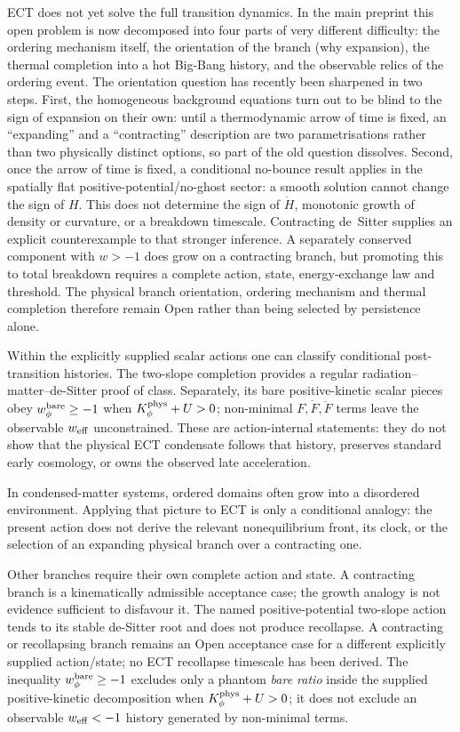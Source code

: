 \documentclass[11pt,a4paper]{article}
\begin{document}
ECT does not yet solve the full transition dynamics.
In the main preprint this open problem is now decomposed into four
parts of very different difficulty: the ordering mechanism itself,
the orientation of the branch (why expansion), the thermal completion
into a hot Big-Bang history, and the observable relics of the
ordering event.
The orientation question has recently been sharpened in two steps.
First, the homogeneous background equations turn out to be blind to
the sign of expansion on their own: until a thermodynamic arrow of
time is fixed, an ``expanding'' and a ``contracting'' description are
two parametrisations rather than two physically distinct options, so
part of the old question dissolves.
Second, once the arrow of time is fixed, a conditional no-bounce
result applies in the spatially flat positive-potential/no-ghost sector: a
smooth solution cannot change the sign of $H$.  This does not determine the
sign of $\dot H$, monotonic growth of density or curvature, or a breakdown
timescale.  Contracting de~Sitter supplies an explicit counterexample to that
stronger inference.  A separately conserved component with $w>-1$ does grow
on a contracting branch, but promoting this to total breakdown requires a
complete action, state, energy-exchange law and threshold.  The physical
branch orientation, ordering mechanism and thermal completion therefore
remain Open rather than being selected by persistence alone.

Within the explicitly supplied scalar actions one can classify
conditional post-transition histories.  The two-slope completion provides a
regular radiation--matter--de-Sitter proof of class.  Separately, its bare
positive-kinetic scalar pieces obey $w_\phi^{\rm bare}\ge-1$ when
$K_\phi^{\rm phys}+U>0$; non-minimal $F,\dot F,\ddot F$ terms leave the
observable $w_{\rm eff}$ unconstrained.  These are action-internal statements:
they do not show that the physical ECT condensate follows that history,
preserves standard early cosmology, or owns the observed late acceleration.

In condensed-matter systems, ordered domains often grow into a disordered
environment.  Applying that picture to ECT is only a conditional analogy:
the present action does not derive the relevant nonequilibrium front, its
clock, or the selection of an expanding physical branch over a contracting
one.

Other branches require their own complete action and state.  A contracting
branch is a kinematically admissible acceptance case; the growth analogy is
not evidence sufficient to disfavour it.  The named positive-potential
two-slope action tends to its stable de-Sitter root and does not produce
recollapse.  A contracting or recollapsing branch remains an Open acceptance
case for a different explicitly supplied action/state; no ECT recollapse
timescale has been derived.  The inequality
$w_\phi^{\rm bare}\ge-1$ excludes only a phantom \emph{bare ratio} inside the
supplied positive-kinetic decomposition when
$K_\phi^{\rm phys}+U>0$; it does not exclude an observable
$w_{\rm eff}<-1$ history generated by non-minimal terms.
\end{document}
